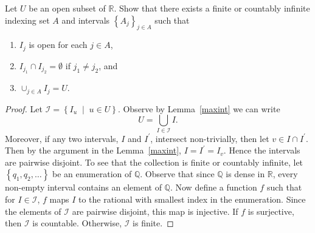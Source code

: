 \documentclass[12pt]{amsart}
\begin{document}
\begin{setup}
  Let $U$ be an open subset of $\mathbb{R}$.
  Show that there exists a finite or countably infinite indexing set $A$ and intervals $\left\{A_j\right\}_{j \in A}$ such that 
  \begin{enumerate}
  \item
    $I_j$ is open for each $j \in A$,
  \item
    $I_{j_1} \cap I_{j_2} = \emptyset$ if $j_1 \not = j_2$, and
  \item
    $\cup_{j \in A} I_j = U$.
  \end{enumerate}

  \begin{proof}
    Let $\mathcal{I} = \left\{I_u \;\middle\vert\; u \in U\right\}$.
    Observe by Lemma~\ref{maxint} we can write $$U = \bigcup_{I \in \mathcal{I}} I.$$
    Moreover, if any two intervals, $I$ and $I^\prime$, intersect non-trivially, then let $v \in I \cap I^\prime$.
    Then by the argument in the Lemma~\ref{maxint}, $I = I^\prime = I_v$.  
    Hence the intervals are pairwise disjoint.
    To see that the collection is finite or countably infinite, let $\left\{q_1, q_2, \ldots\right\}$ be an enumeration of $\mathbb{Q}$.
    Observe that since $\mathbb{Q}$ is dense in $\mathbb{R}$, every non-empty interval contains an element of $\mathbb{Q}$.
    Now define a function $f$ such that for $I \in \mathcal{I}$, $f$ maps $I$ to the rational with smallest index in the enumeration.
    Since the elements of $\mathcal{I}$ are pairwise disjoint, this map is injective.
    If $f$ is surjective, then $\mathcal{I}$ is countable.
    Otherwise, $\mathcal{I}$ is finite.
  \end{proof}
\end{setup}
\end{document}
